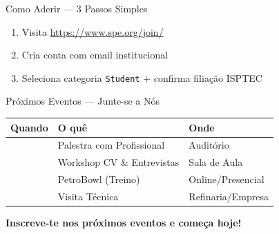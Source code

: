 \documentclass{beamer}
\begin{document}
\begin{frame}{Como Aderir — 3 Passos Simples}
  
  \begin{enumerate}
    \item[\color{spe-accent}\textbf{Passo 1}] Visita \url{https://www.spe.org/join/}
    
    \vspace{0.5em}
    
    \item[\color{spe-accent}\textbf{Passo 2}] Cria conta com email institucional
    
    \vspace{0.5em}
    
    \item[\color{spe-accent}\textbf{Passo 3}] Seleciona categoria \texttt{Student} + confirma filiação ISPTEC
  \end{enumerate}
  
  \vspace{1.5em}
  
  \begin{center}
  \end{center}
\end{frame}

\begin{frame}{Próximos Eventos — Junte-se a Nós}
  
  \begin{tabular}{lll}
    \color{spe-accent}\textbf{Quando} & \color{spe-accent}\textbf{O quê} & \color{spe-accent}\textbf{Onde} \\
    \hline
    [Data] & Palestra com Profissional & Auditório \\
    [Data] & Workshop CV \& Entrevistas & Sala de Aula \\
    [Data] & PetroBowl (Treino) & Online/Presencial \\
    [Data] & Visita Técnica & Refinaria/Empresa \\
  \end{tabular}
  
  \vspace{1.5em}
  
  {\centering\textbf{\color{spe-teal}Inscreve-te nos próximos eventos e começa hoje!}}
\end{frame}
\end{document}
